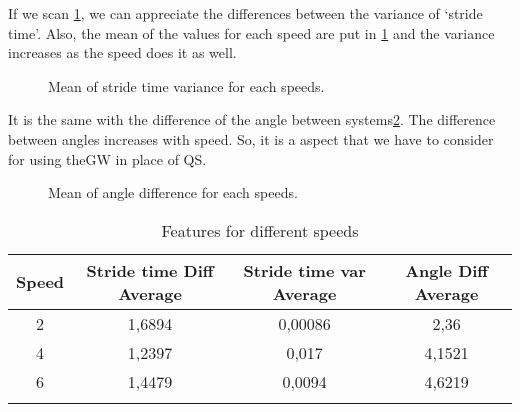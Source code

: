 If we scan \ref{fig:speed_var_stride_time}, we can appreciate the differences between the variance of ‘stride time’. Also, the mean of the values for each speed are put in \ref{tab:speeds} and the variance increases as the speed does it as well.

\begin{figure}[H]
	\centering
	\caption{Mean of stride time variance for each speeds.}
	\label{fig:speed_var_stride_time}
\end{figure}

It is the same with the difference of the angle between systems\ref{fig:speed_angle}. The difference between angles increases with speed. So, it is a aspect that we have to consider for using theGW in place of QS.

\begin{figure}[H]
	\centering
	\caption{Mean of angle difference for each speeds.}
	\label{fig:speed_angle}
\end{figure}

\begin{table}[h]
	\caption{Features for different speeds}	
	\centering
	\begin{tabular}{|c|c|c|c|}\hline
		
		Speed & Stride time Diff Average & Stride time var Average & Angle Diff Average	 	\\ \hline
		2  & 1,6894	 & 0,00086 & 2,36 \\
		4 & 1,2397	& 0,017 & 4,1521\\
		6 & 1,4479 & 0,0094	& 4,6219\\
		\\ \hline
	\end{tabular}
	\label{tab:speeds}
	
\end{table}
